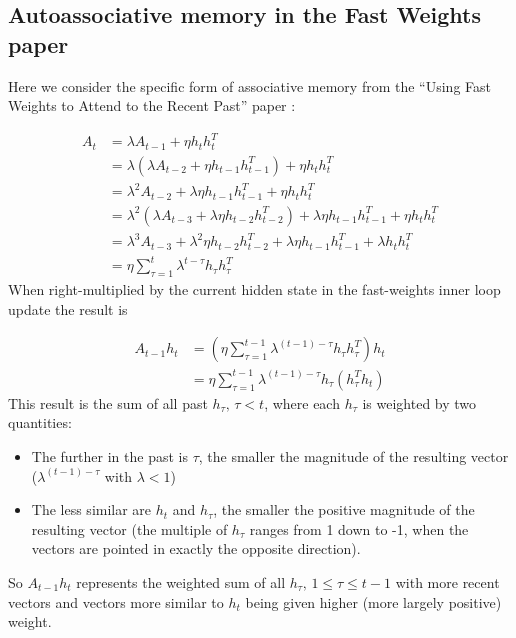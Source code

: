 \subsection{Autoassociative memory in the Fast Weights paper}
\label{sec:autoassoc_memory}

Here we consider the specific form of associative memory from the ``Using Fast Weights to Attend to the Recent Past'' paper \cite[p. 3]{DBLP:conf/nips/BaHMLI16}:

\begin{align*}
  A_t & = \lambda A_{t-1} + \eta h_t h_t^T \\
  & = \lambda \left(\lambda A_{t-2} + \eta h_{t-1} h_{t-1}^T\right) + \eta h_t h_t^T \\
  & = \lambda^2 A_{t-2} + \lambda \eta h_{t-1} h_{t-1}^T + \eta h_t h_t^T \\
  & = \lambda^2 \left(\lambda A_{t-3} + \lambda \eta h_{t-2} h_{t-2}^T \right) + \lambda \eta h_{t-1} h_{t-1}^T + \eta h_t h_t^T \\
  & = \lambda^3 A_{t-3} + \lambda^2 \eta h_{t-2} h_{t-2}^T + \lambda \eta h_{t-1} h_{t-1}^T + \lambda h_t h_t^T \\
  & = \eta \sum_{\tau=1}^{t} \lambda^{t - \tau} h_\tau h_\tau^T
\end{align*}
%
When right-multiplied by the current hidden state in the fast-weights inner loop update the result is

\begin{align*}
  A_{t-1} h_t & = \left(\eta \sum_{\tau=1}^{t-1} \lambda^{(t-1) - \tau} h_\tau h_\tau^T\right) h_t \\
  & = \eta \sum_{\tau=1}^{t-1} \lambda^{(t-1) - \tau} h_\tau \left(h_\tau^T h_t\right)
\end{align*}
%
This result is the sum of all past $h_\tau,\, \tau < t$, where each $h_\tau$ is weighted by two quantities:

\begin{itemize}
\item The further in the past is $\tau$, the smaller the magnitude of the resulting vector ($\lambda^{(t-1) - \tau}$ with $\lambda < 1$)
\item The less similar are $h_t$ and $h_\tau$, the smaller the positive magnitude of the resulting vector (the multiple of $h_\tau$ ranges from 1 down to -1, when the vectors are pointed in exactly the opposite direction).
\end{itemize}
%
So $A_{t-1} h_t$ represents the weighted sum of all $h_\tau,\, 1 \leq \tau \leq t-1$ with more recent vectors and vectors more similar to $h_t$ being given higher (more largely positive) weight.

